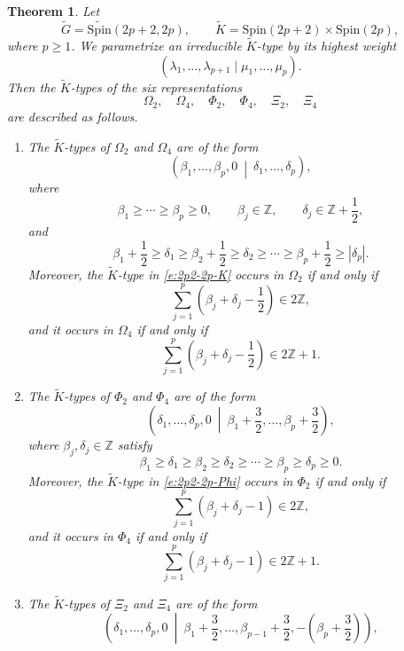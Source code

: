 \documentclass{amsart}
\newcommand{\bbZ}{{\mathbb Z}}
\newcommand{\Spin}{{\mathrm{Spin}}}
\newtheorem{thm}{Theorem}[section]
\theoremstyle{definition}
\newcommand{\tu}{\widetilde}
\begin{document}
\begin{thm}\label{thm:K-types-even-even}
Let
\[
\tu G=\tu{\Spin}(2p+2,2p),
\qquad
\tu K=\Spin(2p+2)\times\Spin(2p),
\]
where \(p\geq 1\). We parametrize an irreducible \(\tu K\)-type by its
highest weight
\[
(\lambda_1,\ldots,\lambda_{p+1}
 \mid
 \mu_1,\ldots,\mu_p).
\]
Then the \(\tu K\)-types of the six representations
\[
\Omega_2,\quad \Omega_4,\quad
\Phi_2,\quad \Phi_4,\quad
\Xi_2,\quad \Xi_4
\]
are described as follows.

\begin{enumerate}
\item The \(\tu K\)-types of  \(\Omega_2\) and \(\Omega_4\) are of the form
\begin{equation}\label{e:2p2-2p-K}
\left(
\beta_1,\ldots,\beta_p,0
\ \middle|\
\delta_1,\ldots,\delta_p
\right),
\end{equation}
where
\[
\beta_1\geq\cdots\geq\beta_p\geq0,
\qquad
\beta_j\in\bbZ,
\qquad
\delta_j\in\bbZ+\frac12,
\]
and
\[
\beta_1+\frac12
\geq\delta_1
\geq\beta_2+\frac12
\geq\delta_2
\geq\cdots
\geq\beta_p+\frac12
\geq|\delta_p|.
\]
Moreover, the \(\tu K\)-type in \eqref{e:2p2-2p-K} occurs in
\(\Omega_2\) if and only if
\[
\sum_{j=1}^p
\left(\beta_j+\delta_j-\frac12\right)
\in 2\bbZ,
\]
and it occurs in \(\Omega_4\) if and only if
\[
\sum_{j=1}^p
\left(\beta_j+\delta_j-\frac12\right)
\in 2\bbZ+1.
\]


\item 
The \(\tu K\)-types of \(\Phi_2\)  and $\Phi_4$  are of the form
\begin{equation}\label{e:2p2-2p-Phi}
\left(
\delta_1,\ldots,\delta_p,0
\ \middle|\
\beta_1+\frac32,\ldots,\beta_p+\frac32
\right),
\end{equation}
where \(\beta_j,\delta_j\in\bbZ\) satisfy
\[
\beta_1
\geq\delta_1
\geq\beta_2
\geq\delta_2
\geq\cdots
\geq\beta_p
\geq\delta_p
\geq0.
\]
Moreover, the \(\tu K\)-type in \eqref{e:2p2-2p-Phi} occurs in
\(\Phi_2\) if and only if
\[
\sum_{j=1}^p
\left(\beta_j+\delta_j-1\right)
\in 2\bbZ,
\]
and it occurs in \(\Phi_4\) if and only if
\[
\sum_{j=1}^p
\left(\beta_j+\delta_j-1\right)
\in 2\bbZ+1.
\]



\item The \(\tu K\)-types of \(\Xi_2\) and $\Xi_4$ are of the form
\begin{equation} \label{e:2p2-2p-Xi}
    \left(
\delta_1,\ldots,\delta_p,0
\ \middle|\
\beta_1+\frac32,\ldots,\beta_{p-1}+\frac32,
-\left(\beta_p+\frac32\right)
\right),
\end{equation}


\end{enumerate}
\end{thm}
\end{document}
